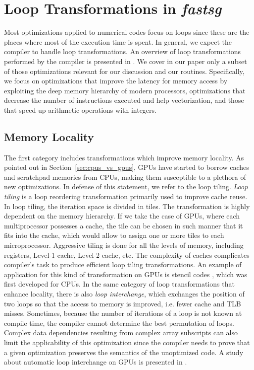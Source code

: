 \section{Loop Transformations in \textit{fastsg}}
\label{sec:optimizations}

Most optimizations applied to numerical codes focus on loops since these are the
places where most of the execution time is spent. In general, we expect the
compiler to handle loop transformations. An overview of loop transformations
performed by the compiler is presented in \cite{Bacon:1994:CTH:197405.197406}.
We cover in our paper only a subset of those optimizations relevant for our
discussion and our routines. Specifically, we focus on optimizations that
improve the latency for memory access by exploiting the deep memory hierarchy
of modern processors, optimizations that decrease the number of instructions
executed and help vectorization, and those that speed up arithmetic operations
with integers.

\subsection{Memory Locality}

The first category includes transformations which improve memory locality. As
pointed out in Section~\ref{sec:cpus_vs_gpus}, GPUs have started to borrow
caches and scratchpad memories from CPUs, making them susceptible to a plethora
of new optimizations. In defense of this statement, we refer to the loop tiling.
\textit{Loop tiling} is a loop reordering transformation primarily used to
improve cache reuse. In loop tiling, the iteration space is divided in tiles.
The transformation is highly dependent on the memory hierarchy. If we take the
case of GPUs, where each multiprocessor possesses a cache, the tile can be
chosen in such manner that it fits into the cache, which would allow to assign
one or more tiles to each microprocessor. Aggressive tiling is done for all the
levels of memory, including registers, Level-1 cache, Level-2 cache, etc. The
complexity of caches complicates compiler's task to produce efficient loop
tiling transformations. An example of application for this kind of
transformation on GPUs is stencil codes \cite{volkov2010}, which was first
developed for CPUs. In the same category of loop transformations that enhance
locality, there is also \textit{loop interchange}, which exchanges the position
of two loops so that the access to memory is improved, i.e. fewer cache and TLB
misses. Sometimes, because the number of iterations of a loop is not known at
compile time, the compiler cannot determine the best permutation of loops.
Complex data dependencies resulting from complex array subscripts can also limit
the applicability of this optimization since the compiler needs to prove that a
given optimization preserves the semantics of the unoptimized code. A study
about automatic loop interchange on GPUs is presented in
\cite{Leung:2009:APG:1596655.1596670}.

